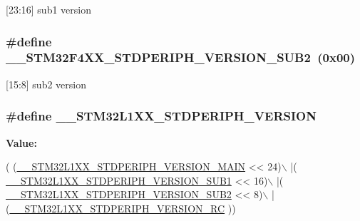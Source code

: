\mbox{[}23\-:16\mbox{]} sub1 version \hypertarget{group___library__configuration__section_ga4b16607e43a35289dc5ebb608b1261d4}{
\subsubsection[{\-\_\-\-\_\-\-S\-T\-M32\-F4\-X\-X\-\_\-\-S\-T\-D\-P\-E\-R\-I\-P\-H\-\_\-\-V\-E\-R\-S\-I\-O\-N\-\_\-\-S\-U\-B2}]{\setlength{\rightskip}{0pt plus 5cm}\#define \-\_\-\-\_\-\-S\-T\-M32\-F4\-X\-X\-\_\-\-S\-T\-D\-P\-E\-R\-I\-P\-H\-\_\-\-V\-E\-R\-S\-I\-O\-N\-\_\-\-S\-U\-B2~(0x00)}}\label{group___library__configuration__section_ga4b16607e43a35289dc5ebb608b1261d4}
\mbox{[}15\-:8\mbox{]} sub2 version \hypertarget{group___library__configuration__section_gaba82d95996b33d5842ee6a157e64c2cc}{
\subsubsection[{\-\_\-\-\_\-\-S\-T\-M32\-L1\-X\-X\-\_\-\-S\-T\-D\-P\-E\-R\-I\-P\-H\-\_\-\-V\-E\-R\-S\-I\-O\-N}]{\setlength{\rightskip}{0pt plus 5cm}\#define \-\_\-\-\_\-\-S\-T\-M32\-L1\-X\-X\-\_\-\-S\-T\-D\-P\-E\-R\-I\-P\-H\-\_\-\-V\-E\-R\-S\-I\-O\-N}}\label{group___library__configuration__section_gaba82d95996b33d5842ee6a157e64c2cc}
{\bfseries Value\-:}
\begin{DoxyCode}
( (\hyperlink{group___library__configuration__section_ga960637daccd901a9725144cbf60b72a8}{\_\_STM32L1XX\_STDPERIPH\_VERSION\_MAIN} << 24)\(\backslash\)
                                             |(
      \hyperlink{group___library__configuration__section_gafdc6317be85b75e56a284dc3d9eb2eb9}{\_\_STM32L1XX\_STDPERIPH\_VERSION\_SUB1} << 16)\(\backslash\)
                                             |(
      \hyperlink{group___library__configuration__section_ga0c6790058c040671530172ceab0539ae}{\_\_STM32L1XX\_STDPERIPH\_VERSION\_SUB2} << 8)\(\backslash\)
                                             |(\hyperlink{group___library__configuration__section_ga9b820cf9de6dad3c37f67f2bc1d04509}{\_\_STM32L1XX\_STDPERIPH\_VERSION\_RC}
      ))
\end{DoxyCode}
